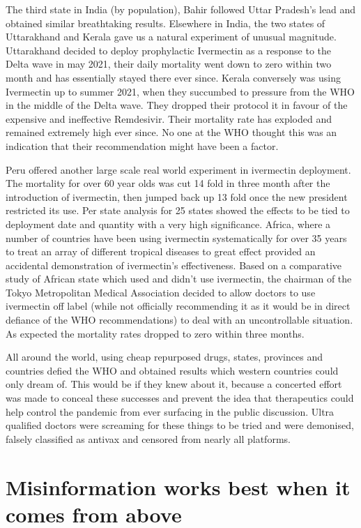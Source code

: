 \documentclass[11pt,a4paper]{article}
\begin{document}
The third state in India (by population), Bahir followed Uttar Pradesh’s lead and obtained similar breathtaking results. Elsewhere in India, the two states of Uttarakhand and Kerala gave us a natural experiment of unusual magnitude. Uttarakhand decided to deploy prophylactic Ivermectin as a response to the Delta wave in may 2021, their daily mortality went down to zero within two month and has essentially stayed there ever since. Kerala conversely was using Ivermectin up to summer 2021, when they succumbed to pressure from the WHO in the middle of the Delta wave. They dropped their protocol it in favour of the expensive and ineffective Remdesivir. Their mortality rate has exploded and remained extremely high ever since. No one at the WHO thought this was an indication that their recommendation might have been a factor.   

Peru offered another large scale real world experiment in ivermectin deployment. The mortality for over 60 year olds was cut 14 fold in three month after the introduction of ivermectin, then jumped back up 13 fold once the new president restricted its use. Per state analysis for 25 states showed the effects to be tied to deployment date and quantity with a very high significance. Africa, where a number of countries have been using ivermectin systematically for over 35 years to treat an array of different tropical diseases to great effect provided an accidental demonstration of ivermectin’s effectiveness. Based on a comparative study of African state which used and didn’t use ivermectin, the chairman of the Tokyo Metropolitan Medical Association decided to allow doctors to use ivermectin off label (while not officially recommending it as it would be in direct defiance of the WHO recommendations) to deal with an uncontrollable situation. As expected the mortality rates dropped to zero within three months.

All around the world, using cheap repurposed drugs, states, provinces and countries defied the WHO and obtained results which western countries could only dream of. This would be if they knew about it, because a concerted effort was made to conceal these successes and prevent the idea that therapeutics could help control the pandemic from ever surfacing in the public discussion. Ultra qualified doctors were screaming for these things to be tried and were demonised, falsely classified as antivax and censored from nearly all platforms. 

\section*{Misinformation works best when it comes from above}
\end{document}
